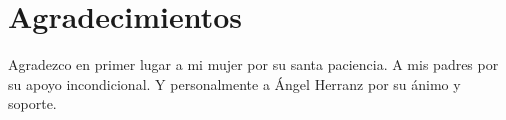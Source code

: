 \chapter*{Agradecimientos}

Agradezco en primer lugar a mi mujer por su santa paciencia. A mis padres por su apoyo incondicional. Y personalmente a Ángel Herranz por su ánimo y soporte.

